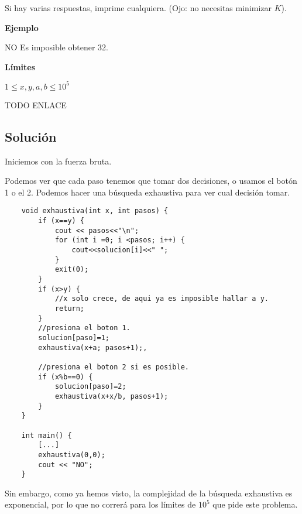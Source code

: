 Si hay varias respuestas, imprime cualquiera. (Ojo: no necesitas minimizar \(K\)).

\textbf{Ejemplo}\\
\begin{casebox3}
	 {
		NO
	}{
		Es imposible obtener 32.
	}
\end{casebox3}

\textbf{Límites}
\begin{plimits}
	\item \(1\leq x, y, a, b \leq 10^5\)
\end{plimits}

TODO ENLACE

\subsection*{Solución}
Iniciemos con la fuerza bruta.

Podemos ver que cada paso tenemos que tomar dos decisiones, o usamos el botón 1 o el 2. Podemos hacer una búsqueda exhaustiva para ver cual decisión tomar.

\begin{minipage}{\linewidth}
\begin{lstlisting}
	void exhaustiva(int x, int pasos) {
		if (x==y) {
			cout << pasos<<"\n";
			for (int i =0; i <pasos; i++) {
				cout<<solucion[i]<<" ";
			}			
			exit(0);
		}
		if (x>y) {
			//x solo crece, de aqui ya es imposible hallar a y.
			return;
		}
		//presiona el boton 1.
		solucion[paso]=1;
		exhaustiva(x+a; pasos+1);,
		
		//presiona el boton 2 si es posible.
		if (x%b==0) {
			solucion[paso]=2;
			exhaustiva(x+x/b, pasos+1);
		}
	}
	
	int main() {
		[...]
		exhaustiva(0,0);
		cout << "NO";
	}
\end{lstlisting}
\end{minipage}

Sin embargo, como ya hemos visto, la complejidad de la búsqueda exhaustiva es exponencial, por lo que no correrá para los límites de \(10^5\) que pide este problema. 

